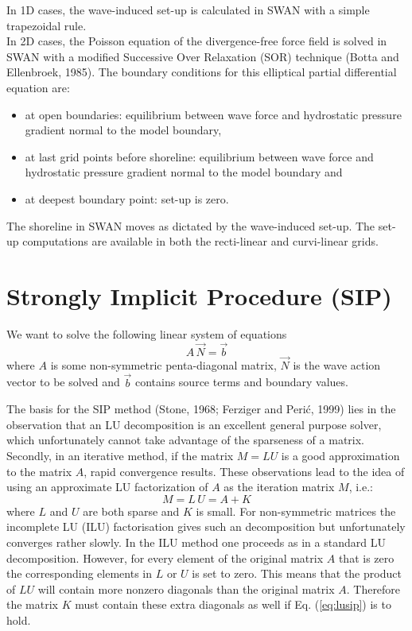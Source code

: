 \documentclass[12pt]{book}
\begin{document}
In 1D cases, the wave-induced set-up is calculated in SWAN with a simple
trapezoidal rule.
\\[2ex]
\noindent
In 2D cases, the Poisson equation of the divergence-free force field is solved in
SWAN with a modified Successive Over Relaxation (SOR) technique (Botta and Ellenbroek, 1985).
The boundary conditions for this elliptical partial differential equation are:
\begin{itemize}
  \item at open boundaries: equilibrium between wave force and hydrostatic pressure gradient
        normal to the model boundary,
  \item at last grid points before shoreline: equilibrium between wave force and hydrostatic
        pressure gradient normal to the model boundary and
  \item at deepest boundary point: set-up is zero.
\end{itemize}
The shoreline in SWAN moves as dictated by the wave-induced set-up. The set-up computations are
available in both the recti-linear and curvi-linear grids.
\nocite{Bot85E}

 \label{ch:solver}

\section{Strongly Implicit Procedure (SIP)}

We want to solve the following linear system of equations
\begin{equation}
  A \, \vec{N} = \vec{b}
\end{equation}
where $A$ is some non-symmetric penta-diagonal matrix, $\vec{N}$ is the wave action vector to be solved and $\vec{b}$
contains source terms and boundary values.

The basis for the SIP method (Stone, 1968; Ferziger and Peri\'{c}, 1999) lies in the observation that an LU decomposition is an excellent
general purpose solver, which unfortunately cannot take advantage of the sparseness of a
matrix. Secondly, in an iterative method, if the matrix $M = LU$ is a good approximation to the
matrix $A$, rapid convergence results. These observations lead to the idea
of using an approximate LU factorization of $A$ as the iteration matrix $M$, i.e.:
\begin{equation}
   M = L\,U = A + K
  \label{eq:lusip}
\end{equation}
where $L$ and $U$ are both sparse and $K$ is small. For non-symmetric matrices the incomplete LU
(ILU) factorisation gives such an decomposition but unfortunately converges rather slowly. In
the ILU method one proceeds as in a standard LU decomposition. However, for every element
of the original matrix $A$ that is zero the corresponding elements in $L$ or $U$ is set to zero. This
means that the product of $LU$ will contain more nonzero diagonals than the original matrix $A$.
Therefore the matrix $K$ must contain these extra diagonals as well if Eq. (\ref{eq:lusip}) is to hold.
\end{document}
